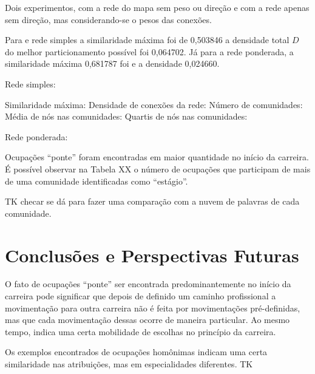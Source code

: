 \documentclass[
  article,
  11pt,
  a4paper,
  english,
  brazil,
  sumario=tradicional]{abntex2}
\begin{document}

Dois experimentos, com a rede do mapa sem peso ou direção e com a rede apenas sem direção, mas considerando-se o pesos das conexões.

Para e rede simples a similaridade máxima foi de 0,503846 a densidade total $D$ do melhor particionamento possível foi 0,064702. Já para a rede ponderada, a similaridade máxima 0,681787 foi e a densidade 0,024660.

Rede simples:

Similaridade máxima:
Densidade de conexões da rede:
Número de comunidades:
Média de nós nas comunidades:
Quartis de nós nas comunidades:

Rede ponderada:




Ocupações \enquote{ponte} foram encontradas em maior quantidade no início da carreira. É possível observar na Tabela XX o número de ocupações que participam de mais de uma comunidade identificadas como \enquote{estágio}.

TK checar se dá para fazer uma comparação com a nuvem de palavras de cada comunidade.

\section{Conclusões e Perspectivas Futuras}

O fato de ocupações \enquote{ponte} ser encontrada predominantemente no início da carreira pode significar que depois de definido um caminho profissional a movimentação para outra carreira não é feita por movimentações pré-definidas, mas que cada movimentação dessas ocorre de maneira particular. Ao mesmo tempo, indica uma certa mobilidade de escolhas no princípio da carreira.

Os exemplos encontrados de ocupações homônimas indicam uma certa similaridade nas atribuições, mas em especialidades diferentes. TK

\newpage


\end{document}

